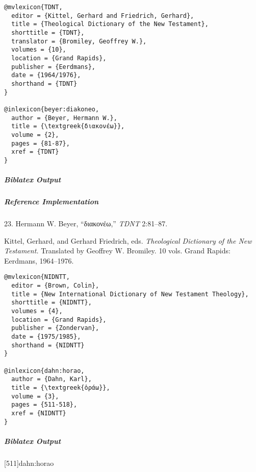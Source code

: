 \documentclass[a4paper]{article}
\newcommand{\textgreek}[1]{{\greekfont #1}}
\newenvironment{biboutput}{%
  \subparagraph{Biblatex Output}
}{\color{black}}
\newenvironment{refimp}{%
  \subparagraph{Reference Implementation}
  \color{reference-colour}
  \rm
}{\par\color{black}}
\begin{document}
\medskip

\begin{lstlisting}
@mvlexicon{TDNT,
  editor = {Kittel, Gerhard and Friedrich, Gerhard},
  title = {Theological Dictionary of the New Testament},
  shorttitle = {TDNT},
  translator = {Bromiley, Geoffrey W.},
  volumes = {10},
  location = {Grand Rapids},
  publisher = {Eerdmans},
  date = {1964/1976},
  shorthand = {TDNT}
}

@inlexicon{beyer:diakoneo,
  author = {Beyer, Hermann W.},
  title = {\textgreek{διακονέω}},
  volume = {2},
  pages = {81-87},
  xref = {TDNT}
}
\end{lstlisting}

\begin{biboutput}
\end{biboutput}

\begin{refimp}
  \hspace*{\bibindent}23. Hermann W. Beyer, “\textgreek{διακονέω},” \emph{TDNT}
  2:81–87.

  \hangindent\bibindent Kittel, Gerhard, and Gerhard Friedrich, eds.
  \emph{Theological Dictionary of the New Testament.} Translated by Geoffrey
  W. Bromiley. 10 vols. Grand Rapids: Eerdmans, 1964–1976.

\end{refimp}

\medskip

\begin{lstlisting}
@mvlexicon{NIDNTT,
  editor = {Brown, Colin},
  title = {New International Dictionary of New Testament Theology},
  shorttitle = {NIDNTT},
  volumes = {4},
  location = {Grand Rapids},
  publisher = {Zondervan},
  date = {1975/1985},
  shorthand = {NIDNTT}
}

@inlexicon{dahn:horao,
  author = {Dahn, Karl},
  title = {\textgreek{ὁράω}},
  volume = {3},
  pages = {511-518},
  xref = {NIDNTT}
}
\end{lstlisting}

\begin{biboutput}
  [511]{dahn:horao}
\end{biboutput}
\end{document}
